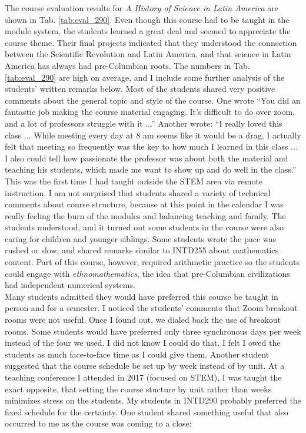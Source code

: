 \documentclass[../../../main.tex]{subfiles}
\begin{document}
The course evaluation results for \textit{A History of Science in Latin America} are shown in Tab. \ref{tab:eval_290}.  Even though this course had to be taught in the module system, the students learned a great deal and seemed to appreciate the course theme.  Their final projects indicated that they understood the connection between the Scientific Revolution and Latin America, and that science in Latin America has always had pre-Columbian roots.  The numbers in Tab. \ref{tab:eval_290} are high on average, and I include some further analysis of the students' written remarks below.  Most of the students shared very positive comments about the general topic and style of the course.  One wrote ``You did an fantastic job making the course material engaging. It’s difficult to do over zoom, and a lot of professors struggle with it ...'' Another wrote: ``I really loved this class ... While meeting every day at 8 am seems like it would be a drag, I actually felt that meeting so frequently was the key to how much I learned in this class ... I also could tell how passionate the professor was about both the material and teaching his students, which made me want to show up and do well in the class.''
\\
\vspace{0.25cm}
This was the first time I had taught outside the STEM area via remote instruction.  I am not surprised that students shared a variety of technical comments about course structure, because at this point in the calendar I was really feeling the burn of the modules and balancing teaching and family.  The students understood, and it turned out some students in the course were also caring for children and younger siblings.  Some students wrote the pace was rushed or slow, and shared remarks similar to INTD255 about mathematics content.  Part of this course, however, required arithmetic practice so the students could engage with \textit{ethnomathematics}, the idea that pre-Columbian civilizations had independent numerical systems.
\\
\vspace{0.25cm}
Many students admitted they would have preferred this course be taught in person and for a semester.  I noticed the students' comments that Zoom breakout rooms were not useful.  Once I found out, we dialed back the use of breakout rooms.  Some students would have preferred only three synchronous days per week instead of the four we used.  I did not know I could do that.  I felt I owed the students as much face-to-face time as I could give them.  Another student suggested that the course schedule be set up by week instead of by unit.  At a teaching conference I attended in 2017 (focused on STEM), I was taught the exact opposite, that setting the course stucture by unit rather than weeks minimizes stress on the students.  My students in INTD290 probably preferred the fixed schedule for the certainty.  One student shared something useful that also occurred to me as the course was coming to a close:
\end{document}

